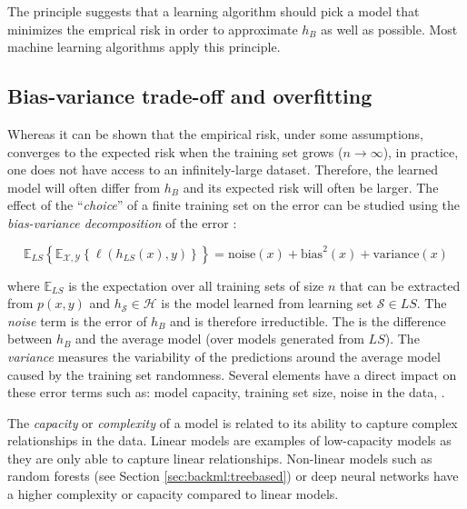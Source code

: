 The  principle suggests that a learning algorithm should pick a model that minimizes the emprical risk in order to approximate $h_B$ as well as possible. Most machine learning algorithms apply this principle.

\subsection{Bias-variance trade-off and overfitting}
\label{ssec:backml:bvtradeoff}

Whereas it can be shown that the empirical risk, under some assumptions, converges to the expected risk when the training set grows ($n \rightarrow \infty$), in practice, one does not have access to an infinitely-large dataset. Therefore, the learned model will often differ from $h_B$ and its expected risk will often be larger. The effect of the ``\textit{choice}'' of a finite training set on the error can be studied using the \textit{bias-variance decomposition} of the error \parencite{geman1992neural, friedman2017elements}:

\begin{equation}
\label{eqn:backml:biasvariancedec}
\mathbb{E}_{LS}\left\{\mathbb{E}_{\mathcal{X},\mathcal{Y}}\left\{ \ell(h_{LS}(x), y)\right\}\right\} = \text{noise}(x) + \text{bias}^2(x) + \text{variance}(x)
\end{equation}

where $\mathbb{E}_{LS}$ is the expectation over all training sets of size $n$ that can be extracted from $p(x,y)$ and $h_{\mathcal{S}} \in \mathcal{H}$ is the model learned from learning set $\mathcal{S} \in LS$. The \textit{noise} term is the error of $h_B$ and is therefore irreductible. The  is the difference between $h_B$ and the average model (over models generated from $LS$). The \textit{variance} measures the variability of the predictions around the average model caused by the training set randomness. Several elements have a direct impact on these error terms such as: model capacity, training set size, noise in the data, \etc. 

The \textit{capacity} or \textit{complexity} of a model is related to its ability to capture complex relationships in the data. Linear models are examples of low-capacity models as they are only able to capture linear relationships. Non-linear models such as random forests (see Section \ref{sec:backml:treebased}) or deep neural networks have a higher complexity or capacity compared to linear models. 

